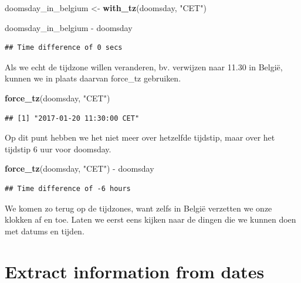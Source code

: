 \documentclass[]{tufte-book}
\newenvironment{Shaded}{}{}
\newcommand{\KeywordTok}[1]{\textcolor[rgb]{0.00,0.44,0.13}{\textbf{#1}}}
\newcommand{\NormalTok}[1]{#1}
\newcommand{\OperatorTok}[1]{\textcolor[rgb]{0.40,0.40,0.40}{#1}}
\newcommand{\StringTok}[1]{\textcolor[rgb]{0.25,0.44,0.63}{#1}}
\begin{document}
\begin{Shaded}
\begin{Highlighting}[]
\NormalTok{doomsday_in_belgium <-}\StringTok{ }\KeywordTok{with_tz}\NormalTok{(doomsday, }\StringTok{"CET"}\NormalTok{) }

\NormalTok{doomsday_in_belgium }\OperatorTok{-}\StringTok{ }\NormalTok{doomsday}
\end{Highlighting}
\end{Shaded}

\begin{verbatim}
## Time difference of 0 secs
\end{verbatim}

Als we echt de tijdzone willen veranderen, bv. verwijzen naar 11.30 in België, kunnen we in plaats daarvan force\_tz gebruiken.

\begin{Shaded}
\begin{Highlighting}[]
\KeywordTok{force_tz}\NormalTok{(doomsday, }\StringTok{"CET"}\NormalTok{)}
\end{Highlighting}
\end{Shaded}

\begin{verbatim}
## [1] "2017-01-20 11:30:00 CET"
\end{verbatim}

Op dit punt hebben we het niet meer over hetzelfde tijdstip, maar over het tijdstip 6 uur voor doomsday.

\begin{Shaded}
\begin{Highlighting}[]
\KeywordTok{force_tz}\NormalTok{(doomsday, }\StringTok{"CET"}\NormalTok{) }\OperatorTok{-}\StringTok{ }\NormalTok{doomsday}
\end{Highlighting}
\end{Shaded}

\begin{verbatim}
## Time difference of -6 hours
\end{verbatim}

We komen zo terug op de tijdzones, want zelfs in België verzetten we onze klokken af en toe. Laten we eerst eens kijken naar de dingen die we kunnen doen met datums en tijden.

\hypertarget{extract-information-from-dates}{%
\section{Extract information from dates}\label{extract-information-from-dates}}
\end{document}
